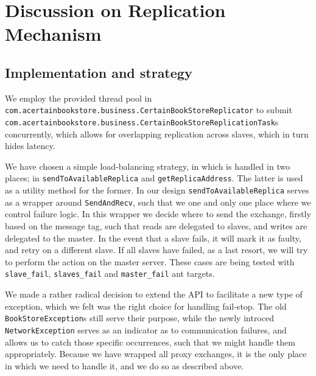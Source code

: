 
\section{Discussion on Replication Mechanism}

\subsection{Implementation and strategy}
We employ the provided thread pool in
{\tt com.acertainbookstore.business.CertainBookStoreReplicator} to submit
{\tt com.acertainbookstore.business.CertainBookStoreReplicationTask}s concurrently,
which allows for overlapping replication across slaves, which in turn hides
latency.

We have chosen a simple load-balancing strategy, in which is handled in two
places; in {\tt sendToAvailableReplica} and {\tt getReplicaAddress}. The latter
is used as a utility method for the former. In our design
{\tt sendToAvailableReplica} serves as a wrapper around {\tt SendAndRecv}, such
that we one and only one place where we control failure logic. In this wrapper
we decide where to send the exchange, firstly based on the message tag, such
that reads are delegated to slaves, and writes are delegated to the master. In
the event that a slave fails, it will mark it as faulty, and retry on a different
slave. If all slaves have failed, as a last resort, we will try to perform the
action on the master server. These cases are being tested with {\tt slave_fail},
{\tt slaves_fail} and {\tt master_fail} ant targets.

We made a rather radical decision to extend the API to facilitate a new type of
exception, which we felt was the right choice for handling fail-stop. The old
{\tt BookStoreException}s still serve their purpose, while the newly introced
{\tt NetworkException} serves as an indicator as to communication failures, and
allows us to catch those specific occurrences, such that we might handle them
appropriately. Because we have wrapped all proxy exchanges, it is the only
place in which we need to handle it, and we do so as described above.


